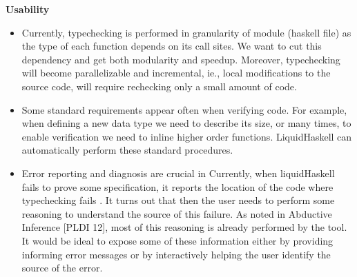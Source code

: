 \textbf{Usability}
\begin{itemize}
\item Currently, typechecking is performed in granularity of module (haskell file)
  as the type of each function depends on its call sites.
  We want to cut this dependency and get both modularity and speedup.
  Moreover, 
  typechecking will become parallelizable and incremental, ie., 
  local modifications to the source code, will require rechecking
  only a small amount of code.


\item 
  Some standard requirements appear often when verifying code. 
  For example, when defining a new data type we need to describe 
  its size,
  or many times, to enable verification we need to inline higher order functions.
  LiquidHaskell can automatically perform these standard procedures.
  



\item Error reporting and diagnosis are crucial in  
Currently, when liquidHaskell fails to prove some specification, 
it reports the location of the code where typechecking fails .
%
  It turns out that then the user needs to perform some reasoning to understand the source of this failure.
  As noted in Abductive Inference [PLDI 12], most of this reasoning is already performed 
  by the tool. 
  It would be ideal to expose some of these information 
  either by providing informing error messages or 
  by interactively helping the user identify the source of the error.
\end{itemize}

